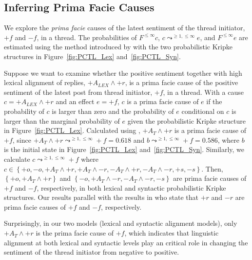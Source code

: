 \subsection{Inferring Prima Facie Causes}

We explore the \emph{prima facie} causes of the latest sentiment of the thread initiator, $+f$ and $-f$, in a thread. The probabilities of $F^{\leq \infty }c$, $c\leadsto^{\geq 1,\leq \infty}e$, and $F^{\leq \infty }e$ are estimated using the method introduced by \textcite{kleinberg_uai09} with the two probabilistic Kripke structures in Figure~\ref{fig:PCTL_Lex} and~\ref{fig:PCTL_Syn}.

Suppose we want to examine whether the positive sentiment together with high lexical alignment of replies, $+A_{LEX} \wedge +r$, is a prima facie cause of the positive sentiment of the latest post from thread initiator, $+f$, in a thread. With a cause $c=+A_{LEX} \wedge +r$ and an effect $e=+f$, $c$ is a prima facie cause of $e$ if the probability of $c$ is larger than zero and the probability of $e$ conditional on $c$ is larger than the marginal probability of $e$ given the probabilistic Kripke structure in Figure~\ref{fig:PCTL_Lex}. Calculated using \textcite{hansson1994logic}, $+A_{T}\wedge+r$ is a prima facie cause of $+f$, since $+A_{T}\wedge+r\leadsto^{\geq 1,\leq \infty}+f = 0.618 $ and $b\leadsto^{\geq 1,\leq \infty}+f = 0.586$, where $b$ is the initial state in Figure~\ref{fig:PCTL_Lex} and~\ref{fig:PCTL_Syn}. Similarly, we calculate $c\leadsto^{\geq 1,\leq \infty}+f$ where $c \in \left \{+o, -o, +A_{T}\wedge+r, +A_{T}\wedge-r, -A_{T}\wedge+r, -A_{T}\wedge-r, +s, -s \right \}$. Then, $\left \{ +o, +A_{T}\wedge +r \right \}$ and $\left \{ -o, +A_{T}\wedge -r, -A_{T} \wedge -r, -s \right \}$ are prima facie causes of $+f$ and $-f$, respectively, in both lexical and syntactic probabilistic Kripke structures. Our results parallel with the results in \textcite{bui2015temporal} who state that $+r$ and $-r$ are prima facie causes of $+f$ and $-f$, respectively.


Surprisingly, in our two models (lexical and syntactic alignment models), only $+A_T \wedge +r$ is the prima facie cause of $+f$, which indicates that linguistic alignment at both lexical and syntactic levels play an critical role in changing the sentiment of the thread initiator from negative to positive. %


